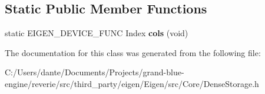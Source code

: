 \subsection*{Static Public Member Functions}
\begin{DoxyCompactItemize}
\item 
\mbox{\label{class_eigen_1_1_dense_storage_3_01_t_00_01_dynamic_00_01_dynamic_00_01___cols_00_01___options_01_4_a274b437b4e66b517494cc88fa08364f5}} 
static E\+I\+G\+E\+N\+\_\+\+D\+E\+V\+I\+C\+E\+\_\+\+F\+U\+NC Index {\bfseries cols} (void)
\end{DoxyCompactItemize}


The documentation for this class was generated from the following file\+:\begin{DoxyCompactItemize}
\item 
C\+:/\+Users/dante/\+Documents/\+Projects/grand-\/blue-\/engine/reverie/src/third\+\_\+party/eigen/\+Eigen/src/\+Core/Dense\+Storage.\+h\end{DoxyCompactItemize}
